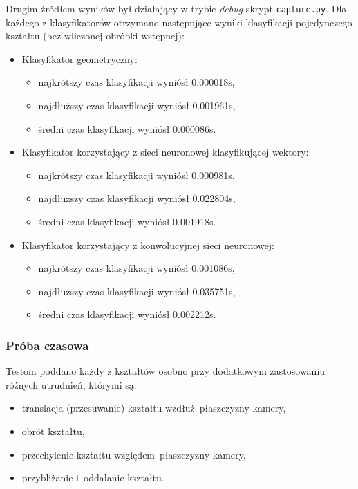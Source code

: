 \documentclass[11pt,a4paper]{article}
\begin{document}
Drugim źródłem wyników był działający w trybie \emph{debug} skrypt \verb+capture.py+. Dla każdego z klasyfikatorów otrzymano następujące wyniki klasyfikacji pojedynczego kształtu (bez wliczonej obróbki wstępnej):
\begin{itemize}
    \item Klasyfikator geometryczny:
    \begin{itemize}
        \item najkrótszy czas klasyfikacji wyniósł 0.000018s,
        \item najdłuższy czas klasyfikacji wyniósł 0.001961s,
        \item średni czas klasyfikacji wyniósł 0.000086s.
    \end{itemize}
    \item Klasyfikator korzystający z sieci neuronowej klasyfikującej wektory:
    \begin{itemize}
        \item najkrótszy czas klasyfikacji wyniósł 0.000981s,
        \item najdłuższy czas klasyfikacji wyniósł 0.022804s,
        \item średni czas klasyfikacji wyniósł 0.001918s.
    \end{itemize}
    \item Klasyfikator korzystający z konwolucyjnej sieci neuronowej:
    \begin{itemize}
        \item najkrótszy czas klasyfikacji wyniósł 0.001086s,
        \item najdłuższy czas klasyfikacji wyniósł 0.035751s,
        \item średni czas klasyfikacji wyniósł 0.002212s.
    \end{itemize}
\end{itemize}

\subsubsection{Próba czasowa}

Testom poddano każdy z kształtów osobno przy dodatkowym zastosowaniu różnych utrudnień, którymi są:
\begin{itemize}
    \item translacja (przesuwanie) kształtu wzdłuż~płaszczyzny kamery,
    \item obrót kształtu,
    \item przechylenie kształtu względem~płaszczyzny kamery,
    \item przybliżanie i~oddalanie kształtu.
\end{itemize}
\end{document}

